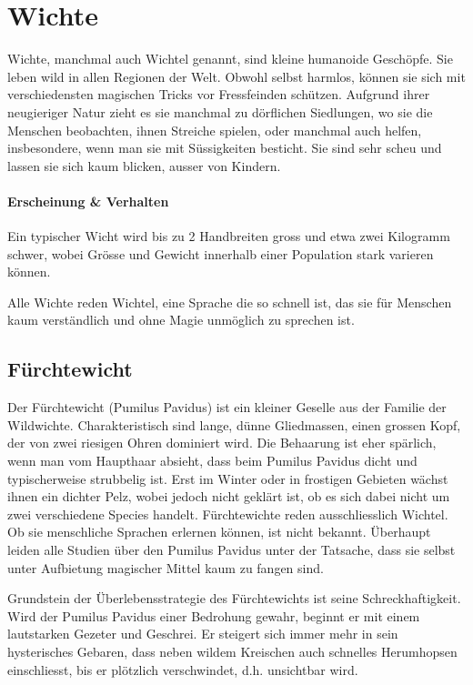 \documentclass[10pt,twoside,twocolumn,openany]{book}
\begin{document}
\newpage \section{Wichte}
\begin{multicols}{2}
Wichte, manchmal auch Wichtel genannt, sind kleine humanoide Geschöpfe. Sie leben wild in allen Regionen der Welt. Obwohl selbst harmlos, können sie sich mit verschiedensten magischen Tricks vor Fressfeinden schützen. Aufgrund ihrer neugieriger Natur zieht es sie manchmal zu dörflichen Siedlungen, wo sie die Menschen beobachten, ihnen Streiche spielen, oder manchmal auch helfen, insbesondere, wenn man sie mit Süssigkeiten besticht. Sie sind sehr scheu und lassen sie sich kaum blicken, ausser von Kindern.
	
\paragraph{Erscheinung \& Verhalten}
Ein typischer Wicht wird bis zu 2 Handbreiten gross und etwa zwei Kilogramm schwer, wobei Grösse und Gewicht innerhalb einer Population stark varieren können.
	
	Alle Wichte reden Wichtel, eine Sprache die so schnell ist, das sie für Menschen kaum verständlich und ohne Magie unmöglich zu sprechen ist.
	
	
	\subsection{Fürchtewicht}
	Der Fürchtewicht (Pumilus Pavidus) ist ein kleiner Geselle aus der Familie der Wildwichte. Charakteristisch sind lange, dünne Gliedmassen, einen grossen Kopf, der von zwei riesigen Ohren dominiert wird. Die Behaarung ist eher spärlich, wenn man vom Haupthaar absieht, dass beim Pumilus Pavidus dicht und typischerweise strubbelig ist. Erst im Winter oder in frostigen Gebieten wächst ihnen ein dichter Pelz, wobei jedoch nicht geklärt ist, ob es sich dabei nicht um zwei verschiedene Species handelt.
	Fürchtewichte reden ausschliesslich Wichtel. Ob sie menschliche Sprachen erlernen können, ist nicht bekannt. Überhaupt leiden alle Studien über den Pumilus Pavidus unter der Tatsache, dass sie selbst unter Aufbietung magischer Mittel kaum zu fangen sind.
	
	Grundstein der Überlebensstrategie des Fürchtewichts ist seine Schreckhaftigkeit. Wird der Pumilus Pavidus einer Bedrohung gewahr, beginnt er mit einem lautstarken Gezeter und Geschrei. Er steigert sich immer mehr in sein hysterisches Gebaren, dass neben wildem Kreischen auch schnelles Herumhopsen einschliesst, bis er plötzlich verschwindet, d.h. unsichtbar wird.
	

\end{multicols}
\end{document}
